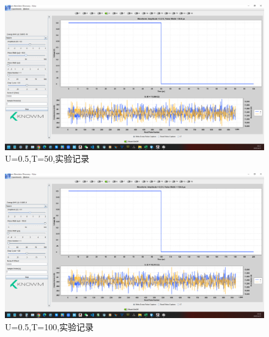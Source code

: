 \documentclass[12pt,hyperref,a4paper,UTF8]{ctexart}
\begin{document}
\begin{figure}[H]
    \centering
    \begin{minipage}{1\textwidth}
        \centering
        \includegraphics[width=1\textwidth]{figures/U05T50.png}
        \caption{U=0.5,T=50,实验记录}
        \label{fig:U05T50}
    \end{minipage}
\end{figure}

\begin{figure}[H]
    \centering
    \begin{minipage}{1\textwidth}
        \centering
        \includegraphics[width=1\textwidth]{figures/U05T100.png}
        \caption{U=0.5,T=100,实验记录}
        \label{fig:U05T100}
    \end{minipage}
\end{figure}
\end{document}
